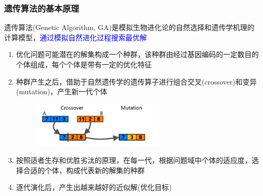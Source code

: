 \documentclass[cjk,slidestop,compress,mathserif,blue]{beamer}
\begin{document}
\frame
{
	\frametitle{遗传算法的基本原理}
	遗传算法\textrm{(Genetic Algorithm, GA)}是模拟生物进化论的自然选择和遗传学机理的计算模型，\textcolor{blue}{通过模拟自然进化过程搜索最优解}
	\begin{enumerate}
		\item 优化问题可能潜在的解集构成一个种群，该种群由经过基因编码的一定数目的个体组成，每个个体是带有一定的优化特征
		\item 种群产生之后，借助于自然遗传学的遗传算子进行组合交叉(\textrm{crossover})和变异(\textrm{mutation})，产生新一代个体
\begin{figure}[h!]
\vspace*{-0.10in}
\centering
\includegraphics[width=2.5in]{Figures/Genetic_Algorithm_basic.png}
\label{Fig:PLA}
\end{figure}
\vspace*{-0.10in}
		\item 按照适者生存和优胜劣汰的原理，在每一代，根据问题域中个体的适应度，选择合适的个体，构成代表新的解集的种群
		\item 逐代演化后，产生出越来越好的近似解(优化目标)
	\end{enumerate}
}
\end{document}
